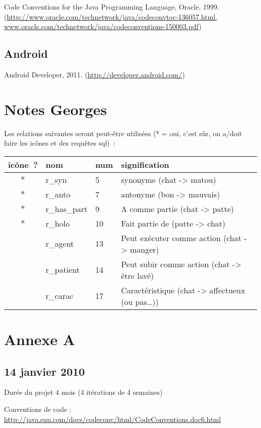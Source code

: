 \documentclass[a4paper,11pt,french]{article}
\begin{document}
Code Conventions for the Java Programming Language, Oracle, 1999. (\url{http://www.oracle.com/technetwork/java/codeconvtoc-136057.html, www.oracle.com/technetwork/java/codeconventions-150003.pdf})

\subsection{Android}

Android Developer, 2011. (\url{http://developer.android.com/})




\section{Notes Georges}
Les relations suivantes seront peut-être utilisées (* = oui, c'est sûr, on a/doit faire les icônes et des requêtes sql)~:

\begin{tabular}{|c|l|l|l|}
\hline
icône~? & nom & num & signification \\
\hline
$*$ & r\_syn       & 5  & synonyme (chat -> matou) \\
$*$ & r\_anto      & 7  & antonyme (bon -> mauvais) \\
$*$ & r\_has\_part & 9  & A comme partie (chat -> patte) \\
$*$ & r\_holo      & 10 & Fait partie de (patte -> chat) \\
    & r\_agent     & 13 & Peut exécuter comme action (chat -> manger) \\
    & r\_patient   & 14 & Peut subir comme action (chat -> être lavé) \\
    & r\_carac     & 17 & Caractéristique (chat -> affectueux (ou pas…)) \\
\hline
\end{tabular}
\newpage

\appendix

\section{Annexe A}


\subsection{14 janvier 2010}


Durée du projet 4 mois (4 itérations de 4 semaines)

Conventions de code : \url{http://java.sun.com/docs/codeconv/html/CodeConventions.doc6.html}
\end{document}
